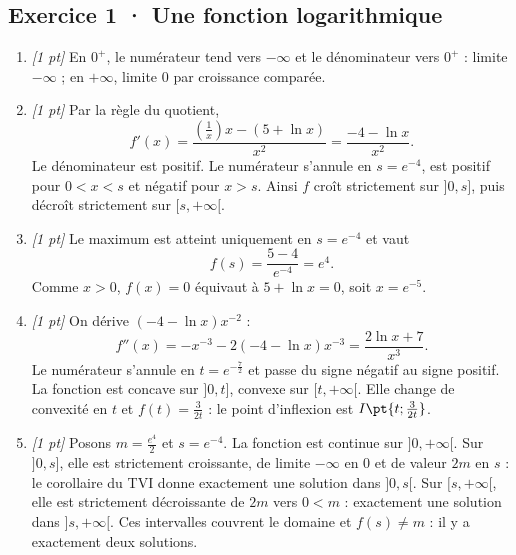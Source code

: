 \subsection*{Exercice 1 · Une fonction logarithmique}\begin{enumerate}

\item \textit{[1 pt]} En $0^+$, le numérateur tend vers $-\infty$ et le dénominateur vers $0^+$ : limite $-\infty$ ; en $+\infty$, limite $0$ par croissance comparée.

\item \textit{[1 pt]} Par la règle du quotient,
\[f'(x)=\frac{(\frac{1}{x})x-(5+\ln x)}{x^2}=\frac{-4-\ln x}{x^2}.\]
Le dénominateur est positif. Le numérateur s'annule en $s=e^{-4}$, est positif pour $0<x<s$ et négatif pour $x>s$. Ainsi $f$ croît strictement sur $]0,s]$, puis décroît strictement sur $[s,+\infty[$.

\item \textit{[1 pt]} Le maximum est atteint uniquement en $s=e^{-4}$ et vaut
\[f(s)=\frac{5- 4}{e^{-4}}=e^{4}.\]
Comme $x>0$, $f(x)=0$ équivaut à $5+\ln x=0$, soit $x=e^{-5}$.

\item \textit{[1 pt]} On dérive $(-4-\ln x)x^{-2}$ :
\[f''(x)=-x^{-3}-2(-4-\ln x)x^{-3}=\frac{2\ln x+7}{x^3}.\]
Le numérateur s'annule en $t=e^{-\frac{7}{2}}$ et passe du signe négatif au signe positif. La fonction est concave sur $]0,t]$, convexe sur $[t,+\infty[$. Elle change de convexité en $t$ et $f(t)=\frac{3}{2t}$ : le point d'inflexion est $I\pt{t;\frac{3}{2t}}$.

\item \textit{[1 pt]} Posons $m=\frac{e^{4}}{2}$ et $s=e^{-4}$. La fonction est continue sur $]0,+\infty[$. Sur $]0,s]$, elle est strictement croissante, de limite $-\infty$ en $0$ et de valeur $2m$ en $s$ : le corollaire du TVI donne exactement une solution dans $]0,s[$. Sur $[s,+\infty[$, elle est strictement décroissante de $2m$ vers $0<m$ : exactement une solution dans $]s,+\infty[$. Ces intervalles couvrent le domaine et $f(s)\ne m$ : il y a exactement deux solutions.

\end{enumerate}

